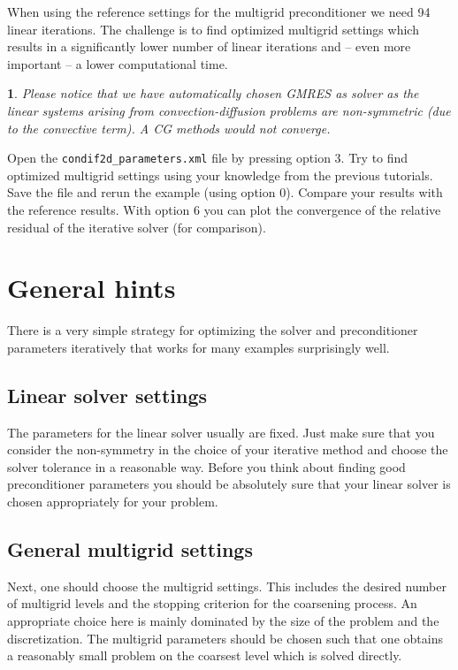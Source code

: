 \documentclass[10pt,fleqn]{book}
\newtheorem*{mycomment}{\ding{42}}
\begin{document}
When using the reference settings for the multigrid preconditioner we need 94 linear iterations. The challenge is to find optimized multigrid settings which results in a significantly lower number of linear iterations and -- even more important -- a lower computational time.

\begin{mycomment}
Please notice that we have automatically chosen GMRES as solver as the linear systems arising from convection-diffusion problems are non-symmetric (due to the convective term). A CG methods would not converge.
\end{mycomment}

\begin{exercise}
Open the \verb|condif2d_parameters.xml| file by pressing option 3. Try to find optimized multigrid settings using your knowledge from the previous tutorials. Save the file and rerun the example (using option 0). Compare your results with the reference results. With option 6 you can plot the convergence of the relative residual of the iterative solver (for comparison).
\end{exercise}

\section{General hints}
\label{sec:generalhings}
There is a very simple strategy for optimizing the solver and preconditioner parameters iteratively that works for many examples surprisingly well.

\subsection{Linear solver settings}
The parameters for the linear solver usually are fixed. Just make sure that you consider the non-symmetry in the choice of your iterative method and choose the solver tolerance in a reasonable way. Before you think about finding good preconditioner parameters you should be absolutely sure that your linear solver is chosen appropriately for your problem.

\subsection{General multigrid settings}
Next, one should choose the multigrid settings. This includes the desired number of multigrid levels and the stopping criterion for the coarsening process. An appropriate choice here is mainly dominated by the size of the problem and the discretization. The multigrid parameters should be chosen such that one obtains a reasonably small problem on the coarsest level which is solved directly.
\end{document}
